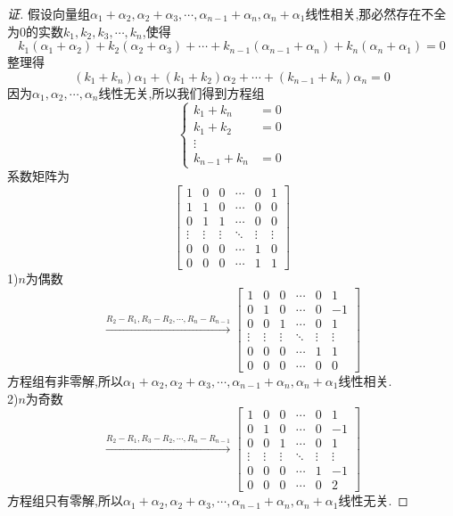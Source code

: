 \documentclass[10pt,a4paper]{report}
\begin{document}
\begin{proof}[证]
	假设向量组$\alpha_{1}+\alpha_{2},\alpha_{2}+\alpha_{3},\cdots , \alpha_{n-1}+\alpha_{n}, \alpha_{n}+\alpha_{1}$线性相关,那必然存在不全为0的实数$k_{1}, k_{2}, k_{3}, \cdots, k_{n}$,使得
	$$k_{1}(\alpha_{1}+\alpha_{2})+k_{2}(\alpha_{2}+\alpha_{3})+\cdots + k_{n-1}(\alpha_{n-1}+\alpha_{n})+ k_{n}(\alpha_{n}+\alpha_{1})=0$$
	整理得
	$$
	(k_{1}+k_{n})\alpha_{1} + (k_{1}+k_{2})\alpha_{2} + \cdots + (k_{n-1}+k_{n})\alpha_{n} = 0
	$$
	因为$\alpha_{1}, \alpha_{2}, \cdots, \alpha_{n}$线性无关,所以我们得到方程组
	$$
	\left\{
	\begin{aligned}
	k_{1}+k_{n} & = 0 \\
	k_{1}+k_{2} & = 0 \\
	\vdots & \\
	k_{n-1}+k_{n} & = 0
	\end{aligned}
	\right.
	$$
	系数矩阵为
	$$
	\left[
	\begin{matrix}
	1 & 0 & 0 & \cdots & 0 & 1 \\
	1 & 1 & 0 & \cdots & 0 & 0 \\
	0 & 1 & 1 & \cdots & 0 & 0 \\
	\vdots & \vdots & \vdots & \ddots & \vdots & \vdots \\
	0 & 0 & 0 & \cdots & 1 & 0 \\
	0 & 0 & 0 & \cdots & 1 & 1
	\end{matrix}
	\right]
	$$
	1)$n$为偶数
	$$
	\xrightarrow{R_{2}-R_{1}, R_{3}-R_{2}, \cdots, R_{n}-R_{n-1}}
	\left[
	\begin{matrix}
	1 & 0 & 0 & \cdots & 0 & 1 \\
	0 & 1 & 0 & \cdots & 0 & -1 \\
	0 & 0 & 1 & \cdots & 0 & 1 \\
	\vdots & \vdots & \vdots & \ddots & \vdots & \vdots \\
	0 & 0 & 0 & \cdots & 1 & 1 \\
	0 & 0 & 0 & \cdots & 0 & 0
	\end{matrix}
	\right]
	$$
	方程组有非零解,所以$\alpha_{1}+\alpha_{2},\alpha_{2}+\alpha_{3},\cdots , \alpha_{n-1}+\alpha_{n}, \alpha_{n}+\alpha_{1}$线性相关.\\
	2)$n$为奇数
	$$
	\xrightarrow{R_{2}-R_{1}, R_{3}-R_{2}, \cdots, R_{n}-R_{n-1}}
	\left[
	\begin{matrix}
	1 & 0 & 0 & \cdots & 0 & 1 \\
	0 & 1 & 0 & \cdots & 0 & -1 \\
	0 & 0 & 1 & \cdots & 0 & 1 \\
	\vdots & \vdots & \vdots & \ddots & \vdots & \vdots \\
	0 & 0 & 0 & \cdots & 1 & -1 \\
	0 & 0 & 0 & \cdots & 0 & 2
	\end{matrix}
	\right]
	$$
	方程组只有零解,所以$\alpha_{1}+\alpha_{2},\alpha_{2}+\alpha_{3},\cdots , \alpha_{n-1}+\alpha_{n}, \alpha_{n}+\alpha_{1}$线性无关.
\end{proof}
\end{document}
